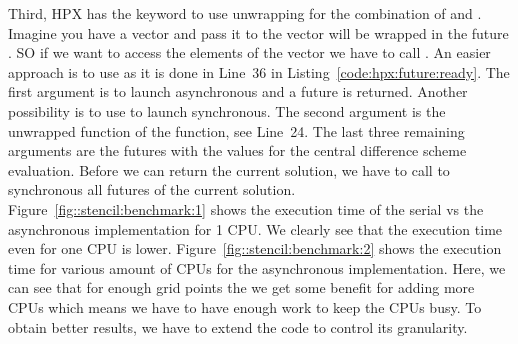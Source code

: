 Third, HPX has the keyword  to use unwrapping for the combination of  and . Imagine you have a vector  and pass it to  the vector  will be wrapped in the future . SO if we want to access the elements of the vector we have to call . An easier approach is to use  as it is done in Line~36 in Listing~\ref{code:hpx:future:ready}. The first argument is  to launch asynchronous and a future is returned. Another possibility is to use  to launch synchronous. The second argument is the unwrapped function of the  function, see Line~24. The last three remaining arguments are the futures with the values for the central difference scheme evaluation. Before we can return the current solution, we have to call  to synchronous all futures of the current solution.\\

Figure~\ref{fig::stencil:benchmark:1} shows the execution time of the serial vs the asynchronous implementation for 1 CPU. We clearly see that the execution time even for one CPU is lower. Figure~\ref{fig::stencil:benchmark:2} shows the execution time for various amount of CPUs for the asynchronous implementation. Here, we can see that for enough grid points the we get some benefit for adding more CPUs which means we have to have enough work to keep the CPUs busy. To obtain better results, we have to extend the code to control its granularity.

